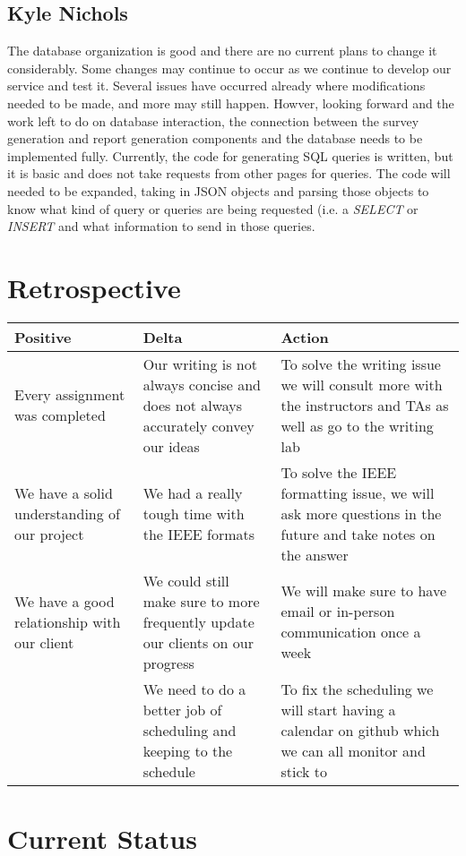 \documentclass[letterpaper,10pt,serif, draftclsnofoot,onecolumn, compsoc, titlepage]{IEEEtran}
\begin{document}
\subsection{Kyle Nichols}
The database organization is good and there are no current plans to change it considerably.
Some changes may continue to occur as we continue to develop our service and test it.
Several issues have occurred already where modifications needed to be made, and more may still happen.
Howver, looking forward and the work left to do on database interaction, the connection between the survey generation and report generation components and the database needs to be implemented fully.
Currently, the code for generating SQL queries is written, but it is basic and does not take requests from other pages for queries.
The code will needed to be expanded, taking in JSON objects and parsing those objects to know what kind of query or queries are being requested (i.e. a \emph{SELECT} or \emph{INSERT} and what information to send in those queries.

\section{Retrospective}
\begin{center}
    \begin{tabular}{ | p{5cm} | p{5cm} | p{5cm} |}
    \hline
     Positive & Delta & Action \\ \hline
  	Every assignment was completed & Our writing is not always concise and does not always accurately convey our ideas & To solve the writing issue we will consult more with the instructors and TAs as well as go to the writing lab \\\hline
	We have a solid understanding of our project & We had a really tough time with the IEEE formats & To solve the IEEE formatting issue, we will ask more questions in the future and take notes on the answer \\ \hline
	We have a good relationship with our client & We could still make sure to more frequently update our clients on our progress & We will make sure to have email or in-person communication once a week \\ \hline
	&We need to do a better job of scheduling and keeping to the schedule& To fix the scheduling we will start having a calendar on github which we can all monitor and stick to \\ \hline
    \end{tabular}
\end{center}

\section{Current Status}
\end{document}
